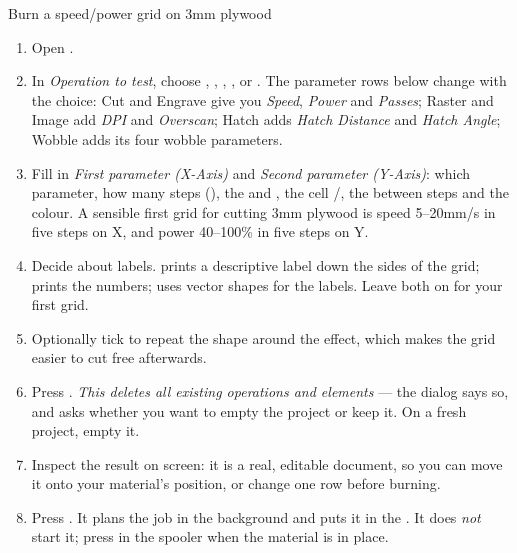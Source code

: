 \begin{walkthrough}{Burn a speed/power grid on 3\unit{mm} plywood}
\begin{enumerate}[label=\arabic*.,leftmargin=1.4em]
  \item Open .
  \item In \emph{Operation to test}, choose , ,
        , ,  or . The parameter
        rows below change with the choice: Cut and Engrave give you
        \emph{Speed}, \emph{Power} and \emph{Passes}; Raster and Image add
        \emph{DPI} and \emph{Overscan}; Hatch adds \emph{Hatch Distance} and
        \emph{Hatch Angle}; Wobble adds its four wobble parameters.
  \item Fill in \emph{First parameter (X-Axis)} and \emph{Second parameter
        (Y-Axis)}: which parameter, how many steps (), the
         and , the cell /,
        the  between steps and the colour. A sensible first grid for
        cutting 3\unit{mm} plywood is speed 5--20\unit{mm/s} in five steps on X,
        and power 40--100\% in five steps on Y.
  \item Decide about labels.  prints a descriptive label down the
        sides of the grid;  prints the numbers;  uses
        vector shapes for the labels. Leave both on for your first grid.
  \item Optionally tick  to repeat the shape around
        the effect, which makes the grid easier to cut free afterwards.
  \item Press . \emph{This deletes all existing operations
        and elements} --- the dialog says so, and asks whether you want to empty
        the project or keep it. On a fresh project, empty it.
  \item Inspect the result on screen: it is a real, editable document, so you can
        move it onto your material's position, or change one row before burning.
  \item Press . It plans the job in the background and puts
        it in the . It does \emph{not} start it; press
         in the spooler when the material is in place.
\end{enumerate}
\end{walkthrough}

